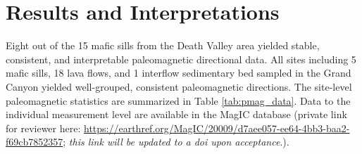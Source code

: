 \documentclass[draft]{agujournal2019}
\begin{document}
\section*{Results and Interpretations}

Eight out of the 15 mafic sills from the Death Valley area yielded stable, consistent, and interpretable paleomagnetic directional data. All sites including 5 mafic sills, 18 lava flows, and 1 interflow sedimentary bed sampled in the Grand Canyon yielded well-grouped, consistent paleomagnetic directions. The site-level paleomagnetic statistics are summarized in Table \ref{tab:pmag_data}. Data to the individual measurement level are available in the MagIC database (private link for reviewer here: \url{https://earthref.org/MagIC/20009/d7aee057-ee64-4bb3-baa2-f69cb7852357}; \textit{this link will be updated to a doi upon acceptance}.).
\end{document}
